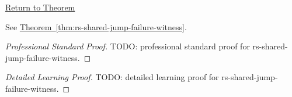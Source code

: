 \newpage
{}
\label{prf:rs-shared-jump-failure-witness}

\begin{remark*}[Return]
\hyperref[thm:rs-shared-jump-failure-witness]{Return to Theorem}
\end{remark*}

\begin{theorem*}
See \hyperref[thm:rs-shared-jump-failure-witness]{Theorem~\ref*{thm:rs-shared-jump-failure-witness}}.
\end{theorem*}

\begin{proof}[Professional Standard Proof]
\LRAProofBodyStart
TODO: professional standard proof for rs-shared-jump-failure-witness.
\end{proof}

\begin{proof}[Detailed Learning Proof]
\LRAProofBodyStart
TODO: detailed learning proof for rs-shared-jump-failure-witness.
\end{proof}

\begin{remark*}
\end{remark*}

\begin{dependencies}
\NoLocalDependencies
\end{dependencies}

\clearpage
